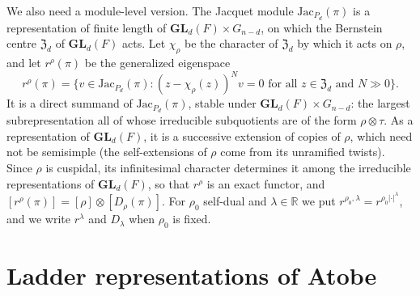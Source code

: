 \documentclass[a4paper,12pt,leqno]{amsart}
\theoremstyle{plain}
\theoremstyle{definition}
\begin{document}
We also need a module-level version. The Jacquet module $\mathrm{Jac}_{P_d}(\pi)$ is a
representation of finite length of $\mathbf{GL}_d(F)\times G_{n-d}$, on which the Bernstein centre
$\mathfrak Z_d$ of $\mathbf{GL}_d(F)$ acts. Let $\chi_\rho$ be the character of $\mathfrak Z_d$ by which it
acts on $\rho$, and let $r^\rho(\pi)$ be the generalized eigenspace
\[r^\rho(\pi)=\{v\in\mathrm{Jac}_{P_d}(\pi):(z-\chi_\rho(z))^Nv=0\text{ for all }z\in\mathfrak
Z_d\text{ and }N\gg0\}.\]
It is a direct summand of $\mathrm{Jac}_{P_d}(\pi)$, stable under $\mathbf{GL}_d(F)\times G_{n-d}$: the
largest subrepresentation all of whose irreducible subquotients are of the form $\rho\otimes\tau$. As a
representation of $\mathbf{GL}_d(F)$, it is a successive extension of copies of $\rho$, which need not
be semisimple (the self-extensions of $\rho$ come from its unramified twists). Since $\rho$ is
cuspidal, its infinitesimal character determines it among the irreducible representations of
$\mathbf{GL}_d(F)$, so that $r^\rho$ is an exact functor, and $[r^\rho(\pi)]=[\rho]\otimes[D_\rho(\pi)]$. For $\rho_0$ self-dual and $\lambda\in\mathbb R$ we put
$r^{\rho_0,\lambda}=r^{\rho_0|\cdot|^\lambda}$, and we write $r^\lambda$ and $D_\lambda$ when $\rho_0$ is fixed.

\section{Ladder representations of Atobe}\label{sec:atobe}
\end{document}
